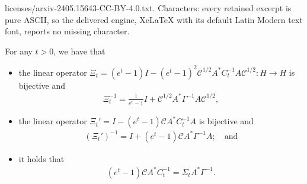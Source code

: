 \documentclass[10pt,a4paper]{amsart}
\newcommand{\C}{\mathcal C}
\begin{document}
licenses/arxiv-2405.15643-CC-BY-4.0.txt. Characters: every retained excerpt is pure ASCII, so the delivered engine, XeLaTeX with its default Latin Modern text font, reports no missing character.
\begin{lemma}\label{lem: Useful equality that show that Sigma is still p.d.}
For any $t>0$, we have that
\begin{itemize}
    \item[(a)] the linear operator $\Xi_t = (e^t-1)I -(e^t-1)^2 \C^{1/2} A^*C_t^{-1}A \C^{1/2} : H \to H$ is bijective and
    \begin{eqnarray*}
    \Xi_t^{-1} = \frac{1}{e^t-1}I + \C^{1/2} A^* \Gamma^{-1}A \C^{1/2},
    \end{eqnarray*}
    \item[(b)] the linear operator $\Xi_t' = I -(e^t-1) \C A^*C_t^{-1}A$ is bijective and
    \begin{eqnarray*}
        \left(\Xi_t'\right)^{-1} = I + (e^t-1)\C A^* \Gamma^{-1}A; \quad \text{and}
    \end{eqnarray*}
    \item[(c)] it holds that
    \begin{eqnarray*}
        (e^t-1) \C A^* C_t^{-1} = \Sigma_t A^* \Gamma^{-1}.
    \end{eqnarray*}
\end{itemize}
\end{lemma}
\end{document}
